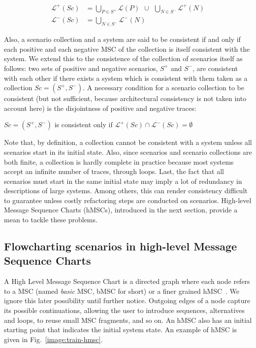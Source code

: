 \vspace{-0.5cm}
\begin{align*}
\mathcal{L}^+(Sc) &= \bigcup_{P \in S^+} \mathcal{L}(P)~~\cup~~\bigcup_{N \in S^{-}} \mathcal{L}^{+}(N) \\
\mathcal{L}^-(Sc) &= \bigcup_{N \in S^-} \mathcal{L}^{-}(N)
\end{align*}

Also, a scenario collection and a system are said to be consistent if and only if each positive and each negative MSC of the collection is itself consistent with the system. We extend this to the consistence of the collection of scenarios itself as follows: two sets of positive and negative scenarios, $S^+$ and $S^-$, are consistent with each other if there exists a system which is consistent with them taken as a collection $Sc = (S^+,S^-)$. A necessary condition for a scenario collection to be consistent (but not sufficient, because architectural consistency is not taken into account here) is the disjointness of positive and negative traces:

\begin{center}
$Sc = (S^+,S^-)$ is consistent only if $\mathcal{L}^+(Sc) \cap \mathcal{L}^-(Sc) = \emptyset$
\end{center}

Note that, by definition, a collection cannot be consistent with a system unless all scenarios start in its initial state. Also, since scenarios and scenario collections are both finite, a collection is hardly complete in practice because most systems accept an infinite number of traces, through loops. Last, the fact that all scenarios must start in the same initial state may imply a lot of redundancy in descriptions of large systems. Among others, this can render consistency difficult to guarantee unless costly refactoring steps are conducted on scenarios. High-level Message Sequence Charts (hMSCs), introduced in the next section, provide a mean to tackle these problems.

\subsection[Flowcharting scenarios in high-level MSCs]{Flowcharting scenarios in high-level Message Sequence Charts\label{section:background-hmsc}}

A High Level Message Sequence Chart is a directed graph where each node refers to a MSC (named \emph{basic} MSC, bMSC for short) or a finer grained hMSC~\cite{ITU:1996}. We ignore this later possibility until further notice. Outgoing edges of a node capture its possible continuations, allowing the user to introduce sequences, alternatives and loops, to reuse small MSC fragments, and so on. An hMSC also has an initial starting point that indicates the initial system state. An example of hMSC is given in Fig.~\ref{image:train-hmsc}. 

